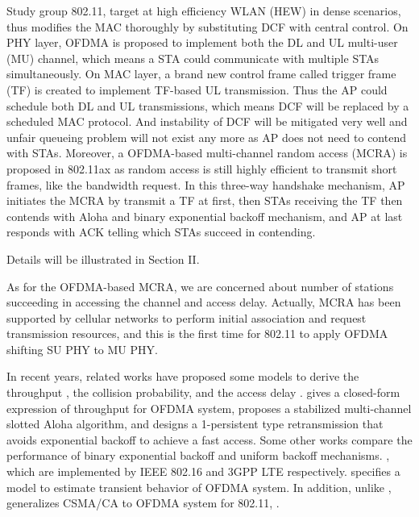 \documentclass[journal]{IEEEtran}
\begin{document}
Study group 802.11, target at high efficiency WLAN (HEW) in dense scenarios, thus modifies the MAC thoroughly by substituting DCF with central control. 
On PHY layer, OFDMA is proposed to implement both the DL and UL multi-user (MU) channel, which means a STA could communicate with multiple STAs simultaneously. 
On MAC layer, a brand new control frame called trigger frame (TF) is created to implement TF-based UL transmission. 
Thus the AP could schedule both DL and UL transmissions, which means DCF will be replaced by a scheduled MAC protocol. 
And instability of DCF will be mitigated very well and unfair queueing problem will not exist any more as AP does not need to contend with STAs.
Moreover, a OFDMA-based multi-channel random access (MCRA) is proposed in 802.11ax as random access is still highly efficient to transmit short frames, like the bandwidth request. 
In this three-way handshake mechanism, AP initiates the MCRA by transmit a TF at first, then STAs receiving the TF then contends with Aloha and binary exponential backoff mechanism, and AP at last responds with ACK telling which STAs succeed in contending.
 
Details will be illustrated in Section II.

As for the OFDMA-based MCRA, we are concerned about number of stations succeeding in accessing the channel and access delay.
Actually, MCRA has been supported by cellular networks to perform initial association and request transmission resources, and this is the first time for 802.11 to apply OFDMA shifting SU PHY to MU PHY.


In recent years, related works have proposed some models to derive the throughput \cite{zhou2008efficient}\cite{shen2003performance}\cite{choi2006multichannel}, the collision probability\cite{kim2012performance}\cite{seo2011design}, and the access delay \cite{zhou2008efficient}\cite{kim2012performance}\cite{seo2011design}\cite{behroozi1992delay}. 
\cite{zhou2008efficient} gives a closed-form expression of throughput for OFDMA system, \cite{shen2003performance} proposes a stabilized multi-channel slotted Aloha algorithm, and \cite{choi2006multichannel} designs a 1-persistent type retransmission that avoids exponential backoff to achieve a fast access.
Some other works compare the performance of binary exponential backoff and uniform backoff mechanisms.  \cite{zhou2008efficient}\cite{seo2011design}\cite{kim2012performance}, which are implemented by IEEE 802.16 and 3GPP LTE respectively.  
\cite{wei2015modeling} specifies a model to estimate transient behavior of OFDMA system.
In addition, unlike \cite{draft_ax}, \cite{GeneralizedOFDMACSMACA} generalizes CSMA/CA to OFDMA system for 802.11, .
\end{document}

